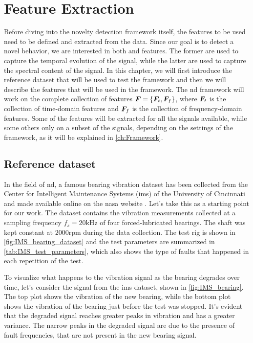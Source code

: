 \chapter{Feature Extraction}
\label{ch:FeatureExtraction}

Before diving into the novelty detection framework itself, the features to be used need to be defined and extracted from the data. Since our goal is to detect a novel behavior, we are interested in both  and  features. The former are used to capture the temporal evolution of the signal, while the latter are used to capture the spectral content of the signal. 
In this chapter, we will first introduce the reference dataset that will be used to test the framework and then we will describe the features that will be used in the framework. The \gls{nd} framework will work on the complete collection of features $\bm{F}=\{\bm{F}_t, \bm{F}_f\}$, where $\bm{F}_t$ is the collection of time-domain features and $\bm{F}_f$ is the collection of frequency-domain features. Some of the features will be extracted for all the signals available, while some others only on a subset of the signals, depending on the settings of the framework, as it will be explained in \autoref{ch:Framework}. 



\section{Reference dataset}
In the field of \gls{nd}, a famous bearing vibration dataset has been collected from the Center for Intelligent Maintenance Systems (\gls{ims}) of the University of Cincinnati and made available online on the \gls{nasa} website \cite{lee2007bearingdataset}. 
Let's take this as a starting point for our work. The dataset contains the vibration measurements collected at a sampling frequency $f_s=20\si{\kHz}$ of four forced-lubricated bearings. The shaft was kept constant at $2000$rpm during the data collection. The test rig is shown in \autoref{fig:IMS_bearing_dataset} and the test parameters are summarized in \autoref{tab:IMS_test_parameters}, which also shows the type of faults that happened in each repetition of the test.

To visualize what happens to the vibration signal as the bearing degrades over time, let's consider the  signal from the \gls{ims} dataset, shown in \autoref{fig:IMS_bearing}. The top plot shows the vibration of the new bearing, while the bottom plot shows the vibration of the bearing just before the test was stopped. It's evident that the degraded signal reaches greater peaks in vibration and has a greater variance. The narrow peaks in the degraded signal are due to the presence of fault frequencies, that are not present in the new bearing signal.

